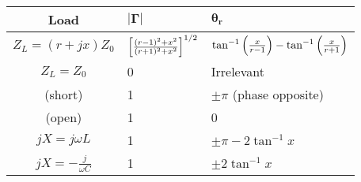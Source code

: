 \documentclass{report}
\begin{document}
{
\renewcommand{\arraystretch}{2.5}
\everymath{\displaystyle}
\begin{table}[H]
	\centering
	\begin{tabularx}{0.8\linewidth}{|c|YY|}
		\hline
		\textbf{Load}              & $\bm{|\Gamma|}$                                       & $\bm{\theta_r}$                                                          \\
		\hline
		$Z_L = (r + jx)Z_0$        & $\left[ \frac{(r-1)^2 + x^2}{(r+1)^2 + x^2} \right]^{1/2}$ & $\tan^{-1} \left( \frac{x}{r-1} \right) - \tan^{-1} \left( \frac{x}{r+1} \right) $ \\
		$Z_L = Z_0$                & 0                                                     & Irrelevant                                                               \\
		(short)                    & 1                                                     & $\pm\pi$ (phase opposite)                                                \\
		(open)                     & 1                                                     & 0                                                                        \\
		$jX = j\omega L$           & 1                                                     & $\pm\pi - 2\tan^{-1}x$                                                   \\
		$jX = -\frac{j}{\omega C}$ & 1                                                     & $\pm 2\tan^{-1}x$                                                        \\
		\hline
	\end{tabularx}
\end{table}
}

%
%
\end{document}
